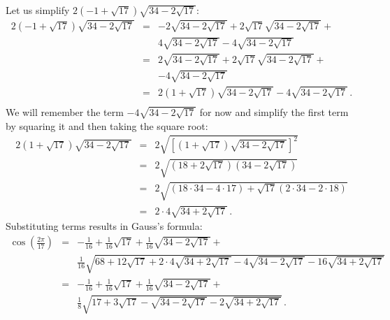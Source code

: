 \documentclass[11pt,a4paper]{article}
\newenvironment{form}[1]{%
\begin{displaymath}%
\renewcommand{\arraystretch}{#1}%
\begin{array}{lcl}}%
{\end{array}%
\end{displaymath}%
}
\newcommand*{\disfrac}[2]{\displaystyle\frac{#1}{#2}}
\begin{document}
Let us simplify $2(-1+\sqrt{17})\sqrt{34-2\sqrt{17}}$:
\begin{form}{1.7}
2(-1+\sqrt{17})\sqrt{34-2\sqrt{17}} &=&
-2\sqrt{34-2\sqrt{17}} +2\sqrt{17}\sqrt{34-2\sqrt{17}}+\\
&&4\sqrt{34-2\sqrt{17}}-4\sqrt{34-2\sqrt{17}}\\
&=&
2\sqrt{34-2\sqrt{17}} +2\sqrt{17}\sqrt{34-2\sqrt{17}}+\\
&&-4\sqrt{34-2\sqrt{17}}\\
&=&2(1+\sqrt{17})\sqrt{34-2\sqrt{17}}-4\sqrt{34-2\sqrt{17}}\,.\\
\end{form}
We will remember the term $-4\sqrt{34-2\sqrt{17}}$ for now and simplify the first term by squaring it and then taking the square root:
\begin{form}{1.8}
2(1+\sqrt{17})\sqrt{34-2\sqrt{17}}&=&
2\sqrt{\left[(1+\sqrt{17})\sqrt{34-2\sqrt{17}}\right]^2}\\
&=&2\sqrt{(18+2\sqrt{17})(34-2\sqrt{17})}\\
&=&2\sqrt{(18\cdot 34-4\cdot17)+\sqrt{17}(2\cdot 34 - 2\cdot 18)}\\
&=&2\cdot 4\sqrt{34+2\sqrt{17}}\,.
\end{form}
Substituting terms results in Gauss's formula:
\begin{form}{2.2}
\cos\left(\disfrac{2\pi}{17}\right) &=& 
-\disfrac{1}{16}+\disfrac{1}{16}\sqrt{17} + 
     \disfrac{1}{16}\sqrt{34-2\sqrt{17}}
    + \\
    &&
     \disfrac{1}{16}\sqrt{
     68+12\sqrt{17} + 
     2\cdot 4\sqrt{34+2\sqrt{17}}-4\sqrt{34-2\sqrt{17}}
   -16
     \sqrt{34+2\sqrt{17}}
   }\\
&=&-\disfrac{1}{16}+\frac{1}{16}\sqrt{17} + 
     \disfrac{1}{16}\sqrt{34-2\sqrt{17}}
    + \\
    &&
     \disfrac{1}{8}\sqrt{
     17+3\sqrt{17} - 
     \sqrt{34-2\sqrt{17}}
   -2
     \sqrt{34+2\sqrt{17}}
   }\,.
\end{form}

\end{document}
